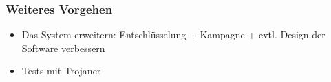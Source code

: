\documentclass[class=scrbook,crop=false]{standalone}
\begin{document}
	\subsubsection*{Weiteres Vorgehen}
	\begin{itemize}
		\item Das System erweitern: Entschlüsselung + Kampagne + evtl. Design der Software verbessern
		\item Tests mit Trojaner
	\end{itemize}
\end{document}
